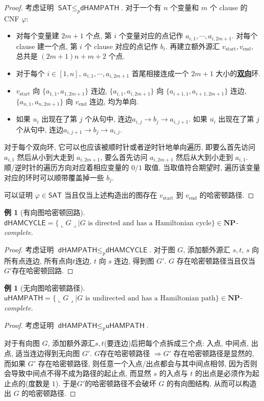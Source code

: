 \documentclass[8pt]{article}
\theoremstyle{compact}
\newtheorem{example}[theorem]{例}
\def\obj#1{\textbf{\uline{#1}}}
\def\le{\leqslant}
\def\rep#1{\llcorner{#1}\lrcorner}
\def\NP{\textbf{NP}}
\begin{document}
\begin{proof}
	考虑证明 $\textsf{SAT} \le_p \textsf{dHAMPATH}$. 对于一个有 $n$ 个变量和 $m$ 个 clause 的 CNF $\varphi$:
	\begin{itemize}
		\item 对每个变量建 $2m + 1$ 个点, 第 $i$ 个变量对应的点记作 $a_{i, 1}, \cdots, a_{i, 2m+1}$. 对每个 clause 建一个点, 第 $i$ 个 clause 对应的点记作 $b_i$. 再建立额外源汇 $v_{\text{start}}, v_{\text{end}}$, 总共是 $(2m+1)n + m + 2$ 个点.
		\item 对于每个 $i \in [1, n]$, $a_{i, 1}, \cdots, a_{i, 2m+1}$ 首尾相接连成一个 $2m+1$ 大小的\obj{双向}环.
		\item $v_{\text{start}}$ 向 $\{a_{1, 1}, a_{1, 2m+1}\}$ 连边, $\{a_{i, 1}, a_{i, 2m+1}\}$ 向 $\{a_{i+1, 1}, a_{i+1, 2m+1}\}$ 连边, $\{a_{n, 1}, a_{n, 2m+1}\}$ 向 $v_{\text{end}}$ 连边, 均为单向.
		\item 如果 $u_i$ 出现在了第 $j$ 个从句中, 连边$a_{i, j} \to b_j \to a_{i, j+1}$. 如果 $\overline{u_i}$ 出现在了第 $j$ 个从句中, 连边$a_{i, j+1} \to b_j \to a_{i, j}$.
	\end{itemize}

	对于每个双向环, 它可以也应该被顺时针或者逆时针地单向遍历, 即要么首先访问 $a_{i, 1}$ 然后从小到大走到 $a_{i, 2m+1}$, 要么首先访问 $a_{i, 2m+1}$ 然后从大到小走到 $a_{i, 1}$. 顺/逆时针的遍历方向对应着相应变量的 $0/1$ 取值, 当取值符合期望时, 遍历该变量对应的环时可以顺带覆盖掉一些 $b_j$.

	可以证明 $\varphi \in \textsf{SAT}$ 当且仅当上述构造出的图存在 $v_{\text{start}}$ 到 $v_{\text{end}}$ 的哈密顿路径.
\end{proof}
\begin{example}[有向图哈密顿回路]
	$\textsf{dHAMCYCLE} = \{\rep{G} | G \text{ is directed and has a Hamiltonian cycle}\} \in \NP$-complete.
\end{example}
\begin{proof}
	考虑证明 $\textsf{dHAMPATH} \le_p \textsf{dHAMCYCLE}$. 对于图 $G$, 添加额外源汇 $s, t$, $s$ 向所有点连边, 所有点向$t$连边, $t$ 向 $s$ 连边, 得到图 $G'$. $G$ 存在哈密顿路径当且仅当$G'$存在哈密顿回路.
\end{proof}
\begin{example}[无向图哈密顿路径]
	$\textsf{uHAMPATH} = \{\rep{G} | G \text{ is undirected and has a Hamiltonian path}\} \in \NP$-complete.
\end{example}
\begin{proof}
	考虑证明 $\textsf{dHAMPATH} \le_p \textsf{uHAMPATH}$. 

	对于有向图 $G$, 添加额外源汇$s, t$(要连边)后把每个点拆成三个点: 入点, 中间点, 出点, 适当连边得到无向图 $G'$. $G$存在哈密顿路径 $\Rightarrow G'$ 存在哈密顿路径是显然的, 而如果 $G'$ 存在哈密顿路径, 则任意一个入点/出点都会与其中间点相邻, 因为否则会导致中间点不得不成为路径的起止点, 而显然 $s$ 的入点与 $t$ 的出点是必须作为起止点的(度数是 $1$). 于是$G'$的哈密顿路径不会破坏 $G$ 的有向图结构, 从而可以构造出 $G$ 的哈密顿路径.	
\end{proof}
\end{document}
